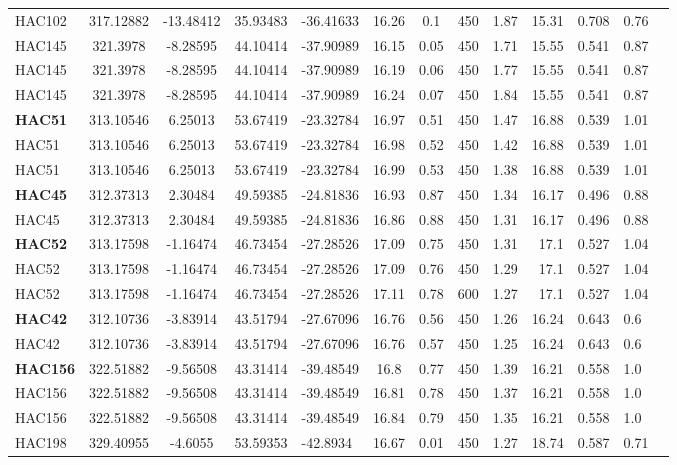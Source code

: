 \documentclass[a4paper,12pt]{article}
\begin{document}
\begin{longtable}{@{\extracolsep{\fill}}lccclccccrlll@{}}
HAC102 & 317.12882 & -13.48412 & 35.93483 & -36.41633 & 16.26 & 0.1 & 450 & 1.87 & 15.31 & 0.708 & 0.76 \\
HAC145 & 321.3978 & -8.28595 & 44.10414 & -37.90989 & 16.15 & 0.05 & 450 & 1.71 & 15.55 & 0.541 & 0.87 \\
HAC145 & 321.3978 & -8.28595 & 44.10414 & -37.90989 & 16.19 & 0.06 & 450 & 1.77 & 15.55 & 0.541 & 0.87 \\
HAC145 & 321.3978 & -8.28595 & 44.10414 & -37.90989 & 16.24 & 0.07 & 450 & 1.84 & 15.55 & 0.541 & 0.87 \\
\textbf{HAC51} & 313.10546 & 6.25013 & 53.67419 & -23.32784 & 16.97 & 0.51 & 450 & 1.47 & 16.88 & 0.539 & 1.01 \\
HAC51 & 313.10546 & 6.25013 & 53.67419 & -23.32784 & 16.98 & 0.52 & 450 & 1.42 & 16.88 & 0.539 & 1.01 \\
HAC51 & 313.10546 & 6.25013 & 53.67419 & -23.32784 & 16.99 & 0.53 & 450 & 1.38 & 16.88 & 0.539 & 1.01 \\
\textbf{HAC45} & 312.37313 & 2.30484 & 49.59385 & -24.81836 & 16.93 & 0.87 & 450 & 1.34 & 16.17 & 0.496 & 0.88 \\
HAC45 & 312.37313 & 2.30484 & 49.59385 & -24.81836 & 16.86 & 0.88 & 450 & 1.31 & 16.17 & 0.496 & 0.88 \\
\textbf{HAC52} & 313.17598 & -1.16474 & 46.73454 & -27.28526 & 17.09 & 0.75 & 450 & 1.31 & 17.1 & 0.527 & 1.04 \\
HAC52 & 313.17598 & -1.16474 & 46.73454 & -27.28526 & 17.09 & 0.76 & 450 & 1.29 & 17.1 & 0.527 & 1.04 \\
HAC52 & 313.17598 & -1.16474 & 46.73454 & -27.28526 & 17.11 & 0.78 & 600 & 1.27 & 17.1 & 0.527 & 1.04 \\
\textbf{HAC42} & 312.10736 & -3.83914 & 43.51794 & -27.67096 & 16.76 & 0.56 & 450 & 1.26 & 16.24 & 0.643 & 0.6 \\
HAC42 & 312.10736 & -3.83914 & 43.51794 & -27.67096 & 16.76 & 0.57 & 450 & 1.25 & 16.24 & 0.643 & 0.6 \\
\textbf{HAC156} & 322.51882 & -9.56508 & 43.31414 & -39.48549 & 16.8 & 0.77 & 450 & 1.39 & 16.21 & 0.558 & 1.0 \\
HAC156 & 322.51882 & -9.56508 & 43.31414 & -39.48549 & 16.81 & 0.78 & 450 & 1.37 & 16.21 & 0.558 & 1.0 \\
HAC156 & 322.51882 & -9.56508 & 43.31414 & -39.48549 & 16.84 & 0.79 & 450 & 1.35 & 16.21 & 0.558 & 1.0 \\
HAC198 & 329.40955 & -4.6055 & 53.59353 & -42.8934 & 16.67 & 0.01 & 450 & 1.27 & 18.74 & 0.587 & 0.71 \\

\end{longtable}
\end{document}
